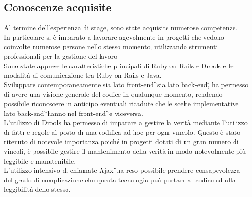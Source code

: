 \subsection{Conoscenze acquisite}
	Al termine dell'esperienza di stage, sono state acquisite numerose competenze.\\
	In particolare si è imparato a lavorare agevolmente in progetti che vedono coinvolte numerose persone nello stesso momento, utilizzando strumenti professionali per la gestione del lavoro.\\
	Sono state apprese le caratteristiche principali di Ruby on Rails e Drools e le modalità di comunicazione tra Ruby on Rails e Java.\\
	Sviluppare contemporaneamente sia lato \gls{front-end}\G\ sia lato \gls{back-end}\G,  ha permesso di avere una visione generale del codice in qualunque momento, rendendo possibile riconoscere in anticipo eventuali ricadute che le scelte implementative lato \gls{back-end}\G\ hanno nel \gls{front-end}\G\ e viceversa.\\
	L'utilizzo di Drools ha permesso di imparare a gestire la verità mediante l'utilizzo di fatti e regole al posto di una codifica ad-hoc per ogni vincolo. Questo è stato ritenuto di notevole importanza poiché in progetti dotati di un gran numero di vincoli, è possibile gestire il mantenimento della verità in modo notevolmente più leggibile e manutenibile.\\
	L'utilizzo intensivo di chiamate \gls{Ajax}\G\ ha reso possibile prendere consapevolezza del grado di complicazione che questa tecnologia può portare al codice ed alla leggibilità dello stesso.\\
	
